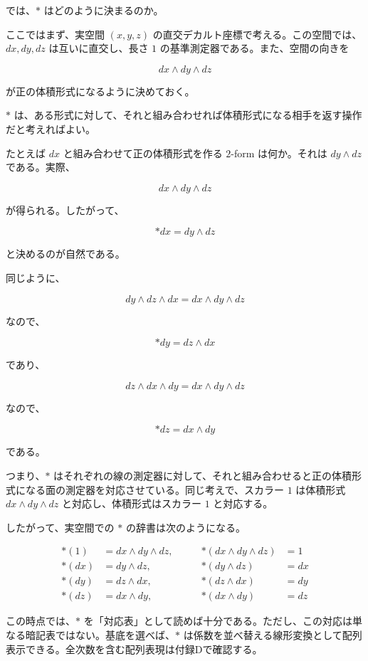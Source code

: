 \documentclass[a4paper,12pt,openany]{book}
\begin{document}
では、\(\ast\) はどのように決まるのか。

ここではまず、実空間 \((x,y,z)\)
の直交デカルト座標で考える。この空間では、\(dx,dy,dz\)
は互いに直交し、長さ \(1\) の基準測定器である。また、空間の向きを

\[
dx \wedge dy \wedge dz
\]

が正の体積形式になるように決めておく。

\(\ast\)
は、ある形式に対して、それと組み合わせれば体積形式になる相手を返す操作だと考えればよい。

たとえば \(dx\) と組み合わせて正の体積形式を作る \(2\)-form
は何か。それは \(dy \wedge dz\) である。実際、

\[
dx \wedge dy \wedge dz
\]

が得られる。したがって、

\[
\ast dx = dy \wedge dz
\]

と決めるのが自然である。

同じように、

\[
dy \wedge dz \wedge dx = dx \wedge dy \wedge dz
\]

なので、

\[
\ast dy = dz \wedge dx
\]

であり、

\[
dz \wedge dx \wedge dy = dx \wedge dy \wedge dz
\]

なので、

\[
\ast dz = dx \wedge dy
\]

である。

つまり、\(\ast\)
はそれぞれの線の測定器に対して、それと組み合わせると正の体積形式になる面の測定器を対応させている。同じ考えで、スカラー
\(1\) は体積形式 \(dx \wedge dy \wedge dz\) と対応し、体積形式はスカラー
\(1\) と対応する。

したがって、実空間での \(\ast\) の辞書は次のようになる。

\[\begin{aligned}
\ast(1) &= dx \wedge dy \wedge dz, \qquad &\ast(dx \wedge dy \wedge dz) &= 1 \\
\ast(dx) &= dy \wedge dz, \qquad &\ast(dy \wedge dz) &= dx \\
\ast(dy) &= dz \wedge dx, \qquad &\ast(dz \wedge dx) &= dy \\
\ast(dz) &= dx \wedge dy, \qquad &\ast(dx \wedge dy) &= dz
\end{aligned}\]

この時点では、\(\ast\)
を「対応表」として読めば十分である。ただし、この対応は単なる暗記表ではない。基底を選べば、\(\ast\)
は係数を並べ替える線形変換として配列表示できる。全次数を含む配列表現は付録Dで確認する。
\end{document}
